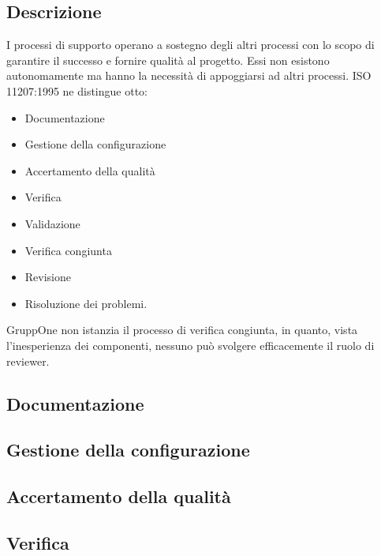 \documentclass[../norme-di-progetto.tex]{subfiles}
\begin{document}
\subsection{Descrizione}%
\label{sub:processi_di_supporto/descrizione}

I processi di supporto operano a sostegno degli altri processi con lo scopo di garantire il successo e fornire qualità al progetto.
Essi non esistono autonomamente ma hanno la necessità di appoggiarsi ad altri processi.
ISO 11207:1995 ne distingue otto:

\begin{itemize}
  \item Documentazione
  \item Gestione della configurazione
  \item Accertamento della qualità
  \item Verifica
  \item Validazione
  \item Verifica congiunta
  \item Revisione
  \item Risoluzione dei problemi.
\end{itemize}

GruppOne non istanzia il processo di verifica congiunta, in quanto, vista l'inesperienza dei componenti, nessuno può svolgere efficacemente il ruolo di reviewer. 

\subsection{Documentazione}%
\label{sub:documentazione}



\subsection{Gestione della configurazione}%
\label{sub:gestione_della_configurazione}



\subsection{Accertamento della qualità}%
\label{subs:accertamento_della_qualita}



\subsection{Verifica}%
\label{sub:verifica}
\end{document}
